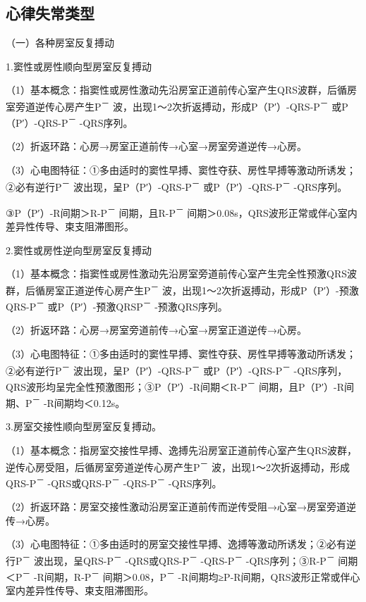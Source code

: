 \subsection{心律失常类型}

（一）各种房室反复搏动

1.窦性或房性顺向型房室反复搏动

（1）基本概念：指窦性或房性激动先沿房室正道前传心室产生QRS波群，后循房室旁道逆传心房产生P\textsuperscript{－}
波，出现1～2次折返搏动，形成P（P′）-QRS-P\textsuperscript{－}
或P（P′）-QRS-P\textsuperscript{－} -QRS序列。

（2）折返环路：心房→房室正道前传→心室→房室旁道逆传→心房。

（3）心电图特征：①多由适时的窦性早搏、窦性夺获、房性早搏等激动所诱发；②必有逆行P\textsuperscript{－}
波出现，呈P（P′）-QRS-P\textsuperscript{－}
或P（P′）-QRS-P\textsuperscript{－} -QRS序列。

③P（P′）-R间期＞R-P\textsuperscript{－} 间期，且R-P\textsuperscript{－}
间期＞0.08s，QRS波形正常或伴心室内差异性传导、束支阻滞图形。

2.窦性或房性逆向型房室反复搏动

（1）基本概念：指窦性或房性激动先沿房室旁道前传心室产生完全性预激QRS波群，后循房室正道逆传心房产生P\textsuperscript{－}
波，出现1～2次折返搏动，形成P（P′）-预激QRS-P\textsuperscript{－}
或P（P′）-预激QRSP\textsuperscript{－} -预激QRS序列。

（2）折返环路：心房→房室旁道前传→心室→房室正道逆传→心房。

（3）心电图特征：①多由适时的窦性早搏、窦性夺获、房性早搏等激动所诱发；②必有逆行P\textsuperscript{－}
波出现，呈P（P′）-QRS-P\textsuperscript{－}
或P（P′）-QRS-P\textsuperscript{－}
-QRS序列，QRS波形均呈完全性预激图形；③P（P′）-R间期＜R-P\textsuperscript{－}
间期，且P（P′）-R间期、P\textsuperscript{－} -R间期均＜0.12s。

3.房室交接性顺向型房室反复搏动。

（1）基本概念：指房室交接性早搏、逸搏先沿房室正道前传心室产生QRS波群，逆传心房受阻，后循房室旁道逆传心房产生P\textsuperscript{－}
波，出现1～2次折返搏动，形成QRS-P\textsuperscript{－}
-QRS或QRS-P\textsuperscript{－} -QRS-P\textsuperscript{－} -QRS序列。

（2）折返环路：房室交接性激动沿房室正道前传而逆传受阻→心室→房室旁道逆传→心房。

（3）心电图特征：①多由适时的房室交接性早搏、逸搏等激动所诱发；②必有逆行P\textsuperscript{－}
波出现，呈QRS-P\textsuperscript{－} -QRS或QRS-P\textsuperscript{－}
-QRS-P\textsuperscript{－} -QRS序列；③R-P\textsuperscript{－}
间期＜P\textsuperscript{－} -R间期，R-P\textsuperscript{－}
间期＞0.08，P\textsuperscript{－}
-R间期均≥P-R间期，QRS波形正常或伴心室内差异性传导、束支阻滞图形。

